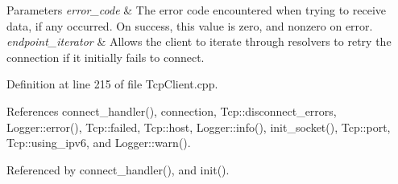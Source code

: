 \begin{DoxyParams}{Parameters}
{\em error\_\-code} & The error code encountered when trying to receive data, if any occurred. On success, this value is zero, and nonzero on error. \\
\hline
{\em endpoint\_\-iterator} & Allows the client to iterate through resolvers to retry the connection if it initially fails to connect. \\
\hline
\end{DoxyParams}


Definition at line 215 of file TcpClient.cpp.



References connect\_\-handler(), connection, Tcp::disconnect\_\-errors, Logger::error(), Tcp::failed, Tcp::host, Logger::info(), init\_\-socket(), Tcp::port, Tcp::using\_\-ipv6, and Logger::warn().



Referenced by connect\_\-handler(), and init().


